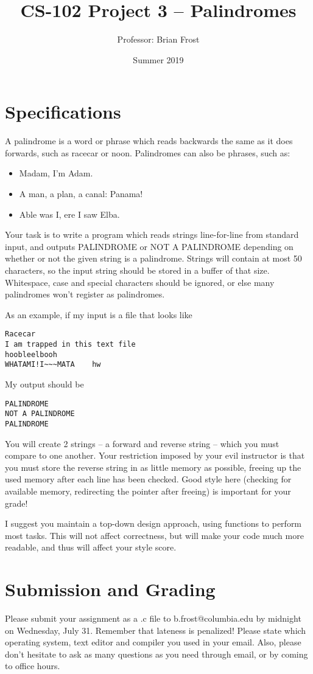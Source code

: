 \documentclass{article}
\title{CS-102 Project 3 -- Palindromes}
\author{Professor: Brian Frost}
\date{Summer 2019}
\begin{document}
\maketitle

\section*{Specifications}
A palindrome is a word or phrase which reads backwards the same as it does forwards, such as racecar or noon. Palindromes can also be phrases, such as:

\begin{itemize}
	\item Madam, I'm Adam.
	\item A man, a plan, a canal: Panama!
	\item Able was I, ere I saw Elba.
\end{itemize}

Your task is to write a program which reads strings line-for-line from standard input, and outputs PALINDROME or NOT A PALINDROME depending on whether or not the given string is a palindrome. Strings will contain at most 50 characters, so the input string should be stored in a buffer of that size. Whitespace, case and special characters should be ignored, or else many palindromes won't register as palindromes.

As an example, if my input is a file that looks like
\begin{verbatim}
Racecar
I am trapped in this text file
hoobleelbooh
WHATAMI!I~~~MATA	hw
\end{verbatim}
My output should be
\begin{verbatim}
PALINDROME
NOT A PALINDROME
PALINDROME
\end{verbatim}

You will create 2 strings -- a forward and reverse string -- which you must compare to one another. Your restriction imposed by your evil instructor is that you must store the reverse string in as little memory as possible, freeing up the used memory after each line has been checked. Good style here (checking for available memory, redirecting the pointer after freeing) is important for your grade!

I suggest you maintain a top-down design approach, using functions to perform most tasks. This will not affect correctness, but will make your code much more readable, and thus will affect your style score.

\section*{Submission and Grading}
Please submit your assignment as a .c file to b.frost@columbia.edu by midnight on Wednesday, July 31. Remember that lateness is penalized! Please state which operating system, text editor and compiler you used in your email. Also, please don't hesitate to ask as many questions as you need through email, or by coming to office hours.
\end{document}
